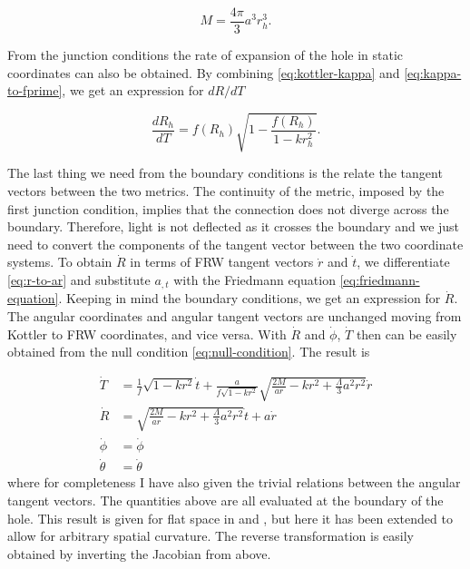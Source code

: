 \begin{equation}
  M = \frac{4\pi}{3} a^3 r_h^3. 
  \label{eq:junction-conditions-mass-volume}
\end{equation}

From the junction conditions the rate of expansion of the hole in static coordinates can also be obtained. By combining \autoref{eq:kottler-kappa} and \autoref{eq:kappa-to-fprime}, we get an expression for $dR/dT$

\begin{equation}
  \frac{dR_h}{dT} = f(R_h) \sqrt{1- \frac{f(R_h)}{1-k r_h^2}}.
  \label{eq:hole-expansion-in-kottler-dR-dT}
\end{equation}

The last thing we need from the boundary conditions is the relate the tangent vectors between the two metrics. The continuity of the metric, imposed by the first junction condition, implies that the connection does not diverge across the boundary. Therefore, light is not deflected as it crosses the boundary and we just need to convert the components of the tangent vector between the two coordinate systems. To obtain $\dot{R}$ in terms of FRW tangent vectors $\dot{r}$ and $\dot{t}$, we differentiate \autoref{eq:r-to-ar} and substitute $a_{,t}$ with the Friedmann equation \autoref{eq:friedmann-equation}. Keeping in mind the boundary conditions, we get an expression for $\dot{R}$. The angular coordinates and angular tangent vectors are unchanged moving from Kottler to FRW coordinates, and vice versa. With $\dot{R}$ and $\dot{\phi}$, $\dot{T}$ then can be easily obtained from the null condition \autoref{eq:null-condition}. The result is

\begin{subequations}
  \begin{align}
    \dot{T} &= \frac{1}{f}\sqrt{1-kr^2} \dot{t} + \frac{a}{f\sqrt{1-kr^2}} \sqrt{\frac{2M}{ar} - kr^2 + \frac{\Lambda}{3}a^2 r^2} \dot{r} \\
    \dot{R} &= \sqrt{\frac{2M}{ar} - kr^2 + \frac{\Lambda}{3}a^2 r^2} \dot{t} + a\dot{r}\\
    \dot{\phi} &= \dot{\phi}\\
    \dot{\theta} &= \dot{\theta}
  \end{align}
  \label{eq:kottler-to-frw-transform-jacobian}%
\end{subequations}
where for completeness I have also given the trivial relations between the angular tangent vectors. The quantities above are all evaluated at the boundary of the hole. This result is given for flat space in \citet{schucker2009strong} and \citet{fleury2013interpretation}, but here it has been extended to allow for arbitrary spatial curvature. The reverse transformation is easily obtained by inverting the Jacobian from above. 

